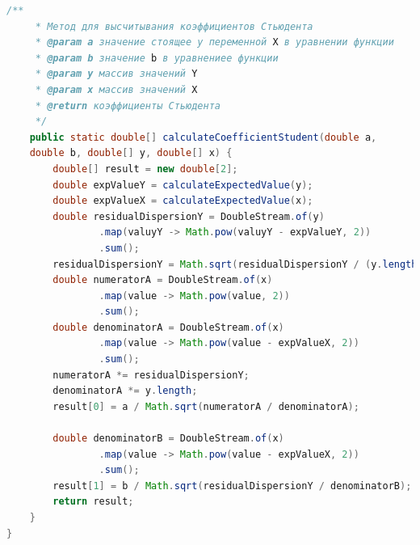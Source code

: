 \documentclass[a4paper,12pt]{article}
\begin{document}
\begin{lstlisting}[language=Java, title=Класс для вспомогательных вычислений]
    /**
     * Метод для высчитывания коэффициентов Стьюдента
     * @param a значение стоящее у переменной X в уравнении функции
     * @param b значение b в уравнениее функции
     * @param y массив значений Y
     * @param x массив значений X
     * @return коэффициенты Стьюдента
     */
    public static double[] calculateCoefficientStudent(double a, 
    double b, double[] y, double[] x) {
        double[] result = new double[2];
        double expValueY = calculateExpectedValue(y);
        double expValueX = calculateExpectedValue(x);
        double residualDispersionY = DoubleStream.of(y)
                .map(valuyY -> Math.pow(valuyY - expValueY, 2))
                .sum();
        residualDispersionY = Math.sqrt(residualDispersionY / (y.length - 2));
        double numeratorA = DoubleStream.of(x)
                .map(value -> Math.pow(value, 2))
                .sum();
        double denominatorA = DoubleStream.of(x)
                .map(value -> Math.pow(value - expValueX, 2))
                .sum();
        numeratorA *= residualDispersionY;
        denominatorA *= y.length;
        result[0] = a / Math.sqrt(numeratorA / denominatorA);

        double denominatorB = DoubleStream.of(x)
                .map(value -> Math.pow(value - expValueX, 2))
                .sum();
        result[1] = b / Math.sqrt(residualDispersionY / denominatorB);
        return result;
    }
}
\end{lstlisting}
\end{document}
